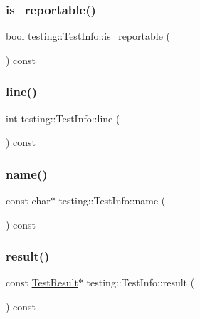 \subsubsection{\texorpdfstring{is\_reportable()}{is\_reportable()}}
{\footnotesize\ttfamily bool testing\+::\+Test\+Info\+::is\+\_\+reportable (\begin{DoxyParamCaption}{ }\end{DoxyParamCaption}) const\hspace{0.3cm}{\ttfamily [inline]}}

\mbox{\label{classtesting_1_1TestInfo_af5931cfc594b5d660c56b3c61c41ea13}} 
\subsubsection{\texorpdfstring{line()}{line()}}
{\footnotesize\ttfamily int testing\+::\+Test\+Info\+::line (\begin{DoxyParamCaption}{ }\end{DoxyParamCaption}) const\hspace{0.3cm}{\ttfamily [inline]}}

\mbox{\label{classtesting_1_1TestInfo_ac2581b45eccc9a3b94cb41c4807d0e34}} 
\subsubsection{\texorpdfstring{name()}{name()}}
{\footnotesize\ttfamily const char$\ast$ testing\+::\+Test\+Info\+::name (\begin{DoxyParamCaption}{ }\end{DoxyParamCaption}) const\hspace{0.3cm}{\ttfamily [inline]}}

\mbox{\label{classtesting_1_1TestInfo_aee8cb884c95cd446129aba936b4159e0}} 
\subsubsection{\texorpdfstring{result()}{result()}}
{\footnotesize\ttfamily const \mbox{\hyperlink{classtesting_1_1TestResult}{Test\+Result}}$\ast$ testing\+::\+Test\+Info\+::result (\begin{DoxyParamCaption}{ }\end{DoxyParamCaption}) const\hspace{0.3cm}{\ttfamily [inline]}}

